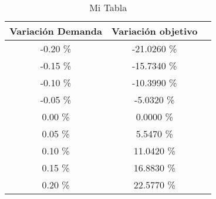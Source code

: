 \begin{table}
\centering
\begin{tabular}{|c|c|c|}
\hline
 Variación Demanda & Variación objetivo \\ \hline
-0.20 \% & -21.0260 \% \\ \hline
-0.15 \% & -15.7340 \% \\ \hline
-0.10 \% & -10.3990 \% \\ \hline
-0.05 \% & -5.0320 \% \\ \hline
0.00 \% & 0.0000 \% \\ \hline
0.05 \% & 5.5470 \% \\ \hline
0.10 \% & 11.0420 \% \\ \hline
0.15 \% & 16.8830 \% \\ \hline
0.20 \% & 22.5770 \% \\ \hline
\end{tabular}
\caption{Mi Tabla}
\end{table}

